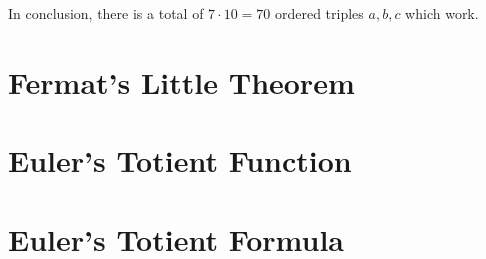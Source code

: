 In conclusion, there is a total of $7\cdot 10=\boxed{70}$ ordered triples $a,b,c$ which work.  
\clearpage

\section{Fermat's Little Theorem}
\clearpage

\section{Euler's Totient Function}
\clearpage

\section{Euler's Totient Formula}  





\clearpage
\thispagestyle{empty} %



\clearpage






